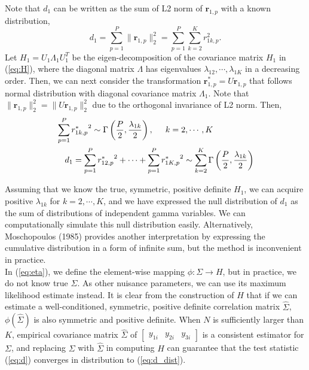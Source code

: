 \documentclass[aap,authoryear, preprint]{imsart}
\numberwithin{equation}{section}
\theoremstyle{plain}
\begin{document}
Note that $d_1$ can be written as the sum of L2 norm of $\bm{r}_{1,p}$ with a known distribution, 
\begin{equation}
d_1 = \sum_{p=1}^{P} \|\bm{r}_{1,p}\|_2^2 = \sum_{p=1}^{P} \sum_{k=2}^K r_{1k,p}^2.
\label{eq:d2}
\end{equation}
Let $H_1 = U_1 \Lambda_1 U_1^T$ be the eigen-decomposition of the covariance matrix $H_1$ in (\ref{eq:H}), where the diagonal matrix $\Lambda$ has eigenvalues $\lambda_{12}, \cdots, \lambda_{1K}$ in a decreasing order. Then, we can next consider the transformation $\bm{r}_{1,p}^* = U\bm{r}_{1,p}$ that follows normal distribution with diagonal covariance matrix $\Lambda_1$. Note that $\|\bm{r}_{1,p}\|_2^2 = \|U\bm{r}_{1,p}\|_2^2$ due to the orthogonal invariance of L2 norm. Then,
\begin{equation}
    \begin{multlined}
    \sum_{p=1}^{P} {r_{1k,p}^*}^2 \sim \Gamma \left( \frac{P}{2}, \frac{\lambda_{1k}}{2} \right), \hspace{5mm} k = 2, \cdots, K\\
    d_1 =  \sum_{p=1}^{P} {r_{12,p}^*}^2 + \cdots +\sum_{p=1}^P{r_{1K,p}^*}^2 \sim \sum_{k=2}^{K} \Gamma \left( \frac{P}{2}, \frac{\lambda_{1k}}{2}\right)
    \end{multlined}
    \label{eq:d_dist}
\end{equation}

Assuming that we know the true, symmetric, positive definite $H_1$, we can acquire positive $\lambda_{1k}$ for $k = 2, \cdots, K$, and we have expressed the null distribution of $d_1$ as the sum of distributions of independent gamma variables. We can computationally simulate this null distribution easily. Alternatively, Moschopoulos (1985) provides another interpretation by expressing the cumulative distribution in a form of infinite sum, but the method is inconvenient in practice.\\

In (\ref{eq:eta}), we define the element-wise mapping $\phi: \Sigma \rightarrow H$, but in practice, we do not know true $\Sigma$. As other nuisance parameters, we can use its maximum likelihood estimate instead. It is clear from the construction of $H$ that if we can estimate a well-conditioned, symmetric, positive definite correlation matrix $\hat{\Sigma}$, $\phi(\hat{\Sigma})$ is also symmetric and positive definite. When $N$ is sufficiently larger than $K$, empirical covariance matrix $\hat{\Sigma}$ of $\begin{bmatrix} y_{1i} & y_{2i} & y_{3i} \end{bmatrix}$ is a consistent estimator for $\Sigma$, and replacing $\Sigma$ with $\hat{\Sigma}$ in computing $H$ can guarantee that the test statistic (\ref{eq:d}) converges in distribution to (\ref{eq:d_dist}). 
\end{document}
